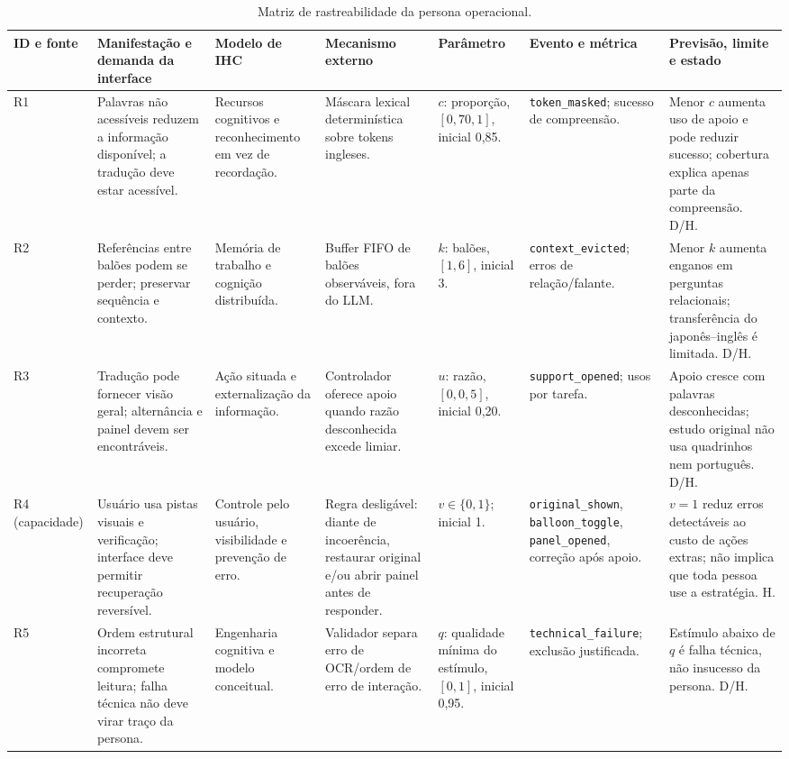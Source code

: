 \documentclass[conference]{IEEEtran}
\newcommand{\code}[1]{\texttt{#1}}
\begin{document}
\begin{table}[t]
\caption{Matriz de rastreabilidade da persona operacional.}
\label{tab:trace}
\centering\scriptsize
\begin{tabularx}{\textwidth}{p{0.7cm}p{2.2cm}Y Y Y Y Y}
\toprule
ID e fonte & Manifestação e demanda da interface & Modelo de IHC & Mecanismo externo & Parâmetro & Evento e métrica & Previsão, limite e estado \\
\midrule
R1 \cite[pp.~1--2, 12--15]{webb2025} & Palavras não acessíveis reduzem a informação disponível; a tradução deve estar acessível. & Recursos cognitivos e reconhecimento em vez de recordação. & Máscara lexical determinística sobre tokens ingleses. & $c$: proporção, $[0{,}70,1]$, inicial 0,85. & \code{token\_masked}; sucesso de compreensão. & Menor $c$ aumenta uso de apoio e pode reduzir sucesso; cobertura explica apenas parte da compreensão. D/H. \\
R2 \cite[pp.~1--2]{kaino2024} & Referências entre balões podem se perder; preservar sequência e contexto. & Memória de trabalho e cognição distribuída. & Buffer FIFO de balões observáveis, fora do LLM. & $k$: balões, $[1,6]$, inicial 3. & \code{context\_evicted}; erros de relação/falante. & Menor $k$ aumenta enganos em perguntas relacionais; transferência do japonês--inglês é limitada. D/H. \\
R3 \cite[pp.~1--2, 12--15]{chung2023} & Tradução pode fornecer visão geral; alternância e painel devem ser encontráveis. & Ação situada e externalização da informação. & Controlador oferece apoio quando razão desconhecida excede limiar. & $u$: razão, $[0,0{,}5]$, inicial 0,20. & \code{support\_opened}; usos por tarefa. & Apoio cresce com palavras desconhecidas; estudo original não usa quadrinhos nem português. D/H. \\
R4 (capacidade) \cite[pp.~37--41]{medhi2007} & Usuário usa pistas visuais e verificação; interface deve permitir recuperação reversível. & Controle pelo usuário, visibilidade e prevenção de erro. & Regra desligável: diante de incoerência, restaurar original e/ou abrir painel antes de responder. & $v\in\{0,1\}$; inicial 1. & \code{original\_shown}, \code{balloon\_toggle}, \code{panel\_opened}, correção após apoio. & $v=1$ reduz erros detectáveis ao custo de ações extras; não implica que toda pessoa use a estratégia. H. \\
R5 \cite[pp.~2--4]{sachdeva2024} & Ordem estrutural incorreta compromete leitura; falha técnica não deve virar traço da persona. & Engenharia cognitiva e modelo conceitual. & Validador separa erro de OCR/ordem de erro de interação. & $q$: qualidade mínima do estímulo, $[0,1]$, inicial 0,95. & \code{technical\_failure}; exclusão justificada. & Estímulo abaixo de $q$ é falha técnica, não insucesso da persona. D/H. \\
\bottomrule
\end{tabularx}
\end{table}
\end{document}
